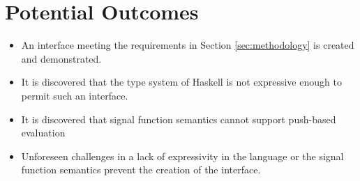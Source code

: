 \documentclass[11pt]{artikel3}
\begin{document}
\section{Potential Outcomes}

\begin{itemize}
\item An interface meeting the requirements in Section \ref{sec:methodology} is created and demonstrated.
\item It is discovered that the type system of Haskell is not expressive enough to permit such an interface.
\item It is discovered that signal function semantics cannot support push-based evaluation
\item Unforeseen challenges in a lack of expressivity in the language or the signal function semantics prevent the creation of the interface. 
\end{itemize}
\end{document}

